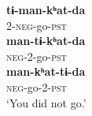\documentclass[oldfontcommands,oneside,a4paper,11pt]{article}
\newcommand{\ipa}[1]{{\phon\textbf{#1}}}
\begin{document}
\begin{exe}
\ex \label{ex:timankhatda2}
\gll 
\ipa{tɨ-man-kʰat-da} \\
2-\textsc{neg}-go-\textsc{pst} \\
\ex
\gll 
\ipa{man-tɨ-kʰat-da} \\
\textsc{neg}-2-go-\textsc{pst} \\
\ex 
\gll 
\ipa{man-kʰat-tɨ-da} \\
\textsc{neg}-go-2-\textsc{pst} \\
\glt `You did not go.'
\end{exe}





 
\end{document}
